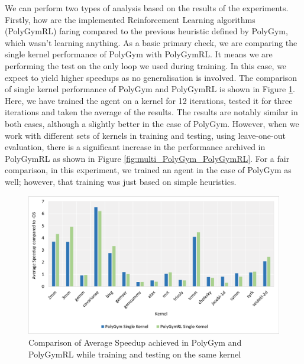 \documentclass[logo,msc]{infthesis}           %
\begin{document}
We can perform two types of analysis based on the results of the experiments. Firstly, how are the implemented Reinforcement Learning algorithms (PolyGymRL) faring compared to the previous heuristic defined by PolyGym, which wasn't learning anything. As a basic primary check, we are comparing the single kernel performance of PolyGym with PolyGymRL. It means we are performing the test on the only loop we used during training. In this case, we expect to yield higher speedups as no generalisation is involved. The comparison of single kernel performance of PolyGym and PolyGymRL is shown in Figure \ref{fig:single_PolyGym_PolyGymRL}. Here, we have trained the agent on a kernel for 12 iterations, tested it for three iterations and taken the average of the results. The results are notably similar in both cases, although a slightly better in the case of PolyGym. However, when we work with different sets of kernels in training and testing, using leave-one-out evaluation, there is a significant increase in the performance archived in PolyGymRL as shown in Figure \ref{fig:multi_PolyGym_PolyGymRL}. For a fair comparison, in this experiment, we trained an agent in the case of PolyGym as well; however, that training was just based on simple heuristics.

\begin{figure}[htbp]
  \centering
  \includegraphics[width=\textwidth]{Images/Chart_Single_PolyGym_PolyGymRL.png}    
  \caption{Comparison of Average Speedup achieved in PolyGym and PolyGymRL while training and testing on the same kernel}
  \label{fig:single_PolyGym_PolyGymRL}
\end{figure}
\end{document}
